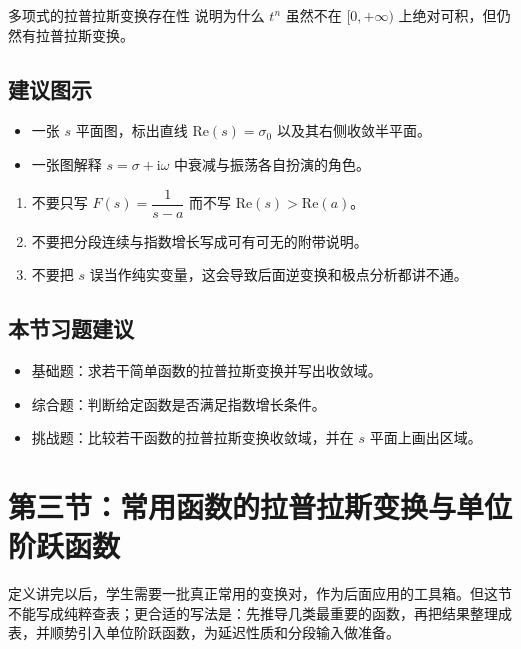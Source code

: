 \begin{lizi}{多项式的拉普拉斯变换存在性}{}
说明为什么 $t^n$ 虽然不在 $[0,+\infty)$ 上绝对可积，但仍然有拉普拉斯变换。
\end{lizi}

\subsection*{建议图示}
\begin{itemize}
    \item 一张 $s$ 平面图，标出直线 $\mathrm{Re}(s)=\sigma_0$ 以及其右侧收敛半平面。
    \item 一张图解释 $s=\sigma+\mathrm{i}\omega$ 中衰减与振荡各自扮演的角色。
\end{itemize}

\begin{jinshi}[本节易错点]
\begin{enumerate}
    \item 不要只写 $F(s)=\dfrac{1}{s-a}$ 而不写 $\mathrm{Re}(s)>\mathrm{Re}(a)$。
    \item 不要把分段连续与指数增长写成可有可无的附带说明。
    \item 不要把 $s$ 误当作纯实变量，这会导致后面逆变换和极点分析都讲不通。
\end{enumerate}
\end{jinshi}

\subsection*{本节习题建议}
\begin{itemize}
    \item 基础题：求若干简单函数的拉普拉斯变换并写出收敛域。
    \item 综合题：判断给定函数是否满足指数增长条件。
    \item 挑战题：比较若干函数的拉普拉斯变换收敛域，并在 $s$ 平面上画出区域。
\end{itemize}

\section{第三节：常用函数的拉普拉斯变换与单位阶跃函数}

\begin{wulibj}[本节要解决的问题]
定义讲完以后，学生需要一批真正常用的变换对，作为后面应用的工具箱。但这节不能写成纯粹查表；更合适的写法是：先推导几类最重要的函数，再把结果整理成表，并顺势引入单位阶跃函数，为延迟性质和分段输入做准备。
\end{wulibj}

